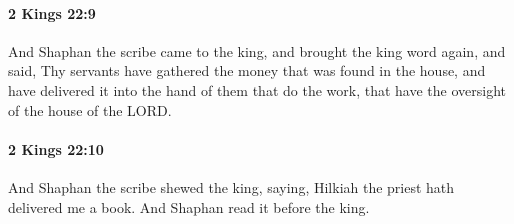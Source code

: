 		\paragraph{2 Kings 22:9} %
			\label{2KINGS-22-9}

			And Shaphan the scribe came to the king, and brought the king word again, and said, Thy servants have gathered the money that was found in the house, and have delivered it into the hand of them that do the work, that have the oversight of the house of the LORD.


		\paragraph{2 Kings 22:10} %
			\label{2KINGS-22-10}

			And Shaphan the scribe shewed the king, saying, Hilkiah the priest hath delivered me a book. And Shaphan read it before the king.

